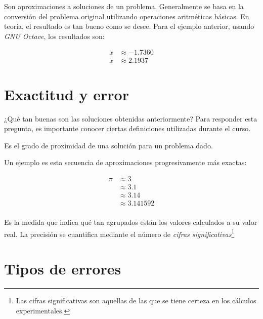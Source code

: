 Son aproximaciones a soluciones de un problema. Generalmente se basa en
la conversión del problema original utilizando operaciones aritméticas
básicas. En teoría, el resultado es tan bueno como se desee. Para el
ejemplo anterior, usando \emph{GNU Octave}, los resultados son:

\begin{align*}
    x & \approx -1.7360 \\
    x & \approx 2.1937
\end{align*}

\section{Exactitud y error}

¿Qué tan buenas son las soluciones obtenidas anteriormente? Para
responder esta pregunta, es importante conocer ciertas definiciones
utilizadas durante el curso.

\begin{definition}[Exactitud]
    Es el grado de proximidad de una solución para un problema dado.


\end{definition}

\begin{eg}
    Un ejemplo es esta secuencia de aproximaciones progresivamente más exactas:

    \begin{align*} 
        \pi &\approx 3 \\ 
            &\approx 3.1 \\ 
            &\approx 3.14 \\ 
            &\approx 3.141592 \\ 
    \end{align*}

\end{eg}

\begin{definition}[Precisión]
    Es la medida que indica qué tan agrupados están los valores calculados a
    su valor real. La precisión se cuantifica mediante el número de
    \emph{cifras significativas}\footnote{Las cifras significativas son
    aquellas de las que se tiene certeza en los cálculos experimentales.}
\end{definition}


\section{Tipos de errores}

